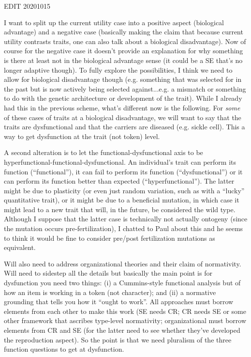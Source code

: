 \documentclass{article}
\begin{document}
EDIT 20201015

I want to split up the current utility case into a positive aspect (biological advantage) and a negative case (basically making the claim that because current utility contrasts traits, one can also talk about a biological disadvantage). Now of course for the negative case it doesn't provide an explanation for why something is there at least not in the biological advantage sense (it could be a SE that's no longer adaptive though). To fully explore the possibilities, I think we need to allow for biological disadvantage though (e.g. something that was selected for in the past but is now actively being selected against...e.g. a mismatch or something to do with the genetic architecture or development of the trait). While I already had this in the previous scheme, what's different now is the following. For \emph{some} of these cases of traits at a biological disadvantage, we will want to say that the traits are dysfunctional and that the carriers are diseased (e.g. sickle cell). This a way to get dysfunction at the trait (not token) level.

A second alteration is to let the functional-dysfunctional axis to be hyperfunctional-functional-dysfunctional. An individual's trait can perform its function (``functional''), it can fail to perform its function (``dysfunctional'') or it can perform its function better than expected (``hyperfunctional''). The latter might be due to plasticity (or even just random variation, such as with a ``lucky'' quantitative trait), or it might be due to a beneficial mutation, in which case it might lead to a new trait that will, in the future, be considered the wild type. Although I suppose that the latter case is technically not actually ontogeny (since the mutation occurs pre-fertilization), I chatted to Paul about this and he seems to think it would be fine to consider pre/post fertilization mutations as equivalent.

Will also need to address organizational theories and their claim of normativity. Will need to sidestep all the details but basically the main point is for dysfunction you need two things: (i) a Cummins-style functional analysis but of how an item is working in a token (not character); and (ii) a normative grounding that tells you how it ``ought to work''. All approaches must borrow elements from each other to make this work (SE needs CR; CR needs SE or some other framework that ascribes type-level normativity; organizational must borrow elements from CR and SE (for the latter need to see whether they've developed the reproduction aspect). So the point is that we need pluralism of the three function questions to get at dysfunction.
\end{document}
